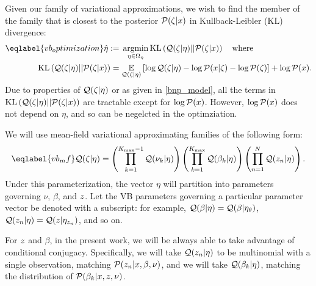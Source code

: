 Given our family of variational approximations, we wish to find the member of
the family that is closest to the posterior $\mathcal{P}(\zeta \vert x)$ in
Kullback-Leibler (KL) divergence:
%
\begin{align}\eqlabel{vb_optimization}
%
\etaopt :={}&
    \argmin_{\eta \in \etadom}
        \KL{\q(\zeta \vert \eta) || \p(\zeta \vert \x)} \mathwhere \\
\KL{\q(\zeta \vert \eta) || \p(\zeta \vert \x)}
={}&    \expect{\q(\zeta \vert \eta)}{
        \log \q(\zeta \vert \eta) - \logp(\x \vert \zeta) -
        \logp(\zeta)} + \logp(\x). \nonumber
%
\end{align}
%
Due to properties of $\mathcal{Q}(\zeta \vert \eta)$ or as given in \eqref{bnp_model},
all the terms in $\mathrm{KL}\left(\mathcal{Q}(\zeta \vert \eta) || \mathcal{P}(\zeta \vert x)\right)$ are tractable
except for $\log \mathcal{P}(x)$.  However, $\log \mathcal{P}(x)$ does not depend on $\eta$, and
so can be negelcted in the optimziation.

We will use mean-field variational approximating families of the following form:
%
\begin{align}\eqlabel{vb_mf}
%
\q(\zeta \vert \eta) =
    \left( \prod_{\k=1}^{\kmax - 1} \q(\nuk \vert \eta) \right)
    \left( \prod_{\k=1}^{\kmax} \q(\beta_\k \vert \eta) \right)
    \left( \prod_{\n=1}^{\N} \q(\z_{\n} \vert \eta) \right).
%
\end{align}
%
Under this parameterization, the vector $\eta$ will partition into parameters
governing $\nu$, $\beta$, and $z$.  Let the VB parameters governing a
particular parameter vector be denoted with a subscript: for example, $\mathcal{Q}(\beta
\vert \eta) = \mathcal{Q}(\beta \vert \eta_{\theta})$, $\mathcal{Q}(z_n \vert \eta) = \mathcal{Q}(z \vert
\eta_{z_{n}})$, and so on.

For $z$ and $\beta$, in the present work, we will be always able to take
advantage of conditional conjugacy.  Specifically, we will take $\mathcal{Q}(z_{n}
\vert \eta)$ to be multinomial with a single observation, matching $\mathcal{P}(z_{n}
\vert x, \beta, \nu)$, and we will take $\mathcal{Q}(\beta_k \vert \eta)$, matching
the distribution of $\mathcal{P}(\beta_{k} \vert x, z, \nu)$.


